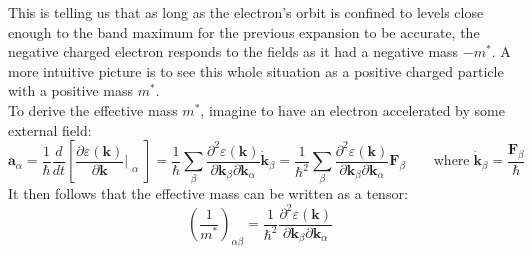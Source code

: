 \documentclass[10.75pt,a4paper,openright,bottom=2cm]{article}
\renewcommand{\Vec}[1]{\boldsymbol{#1}}
\begin{document}
This is telling us that as long as the electron's orbit is confined to levels close enough to the band maximum for the previous expansion to be accurate, the negative charged electron responds to the fields as it had a negative mass $-m^*$. A more intuitive picture is to see this whole situation as a positive charged particle with a positive mass $m^*$.\\
To derive the effective mass $m^*$, imagine to have an electron accelerated by some external field:
\[
\Vec{a}_\alpha=\frac{1}{\hbar}\frac{d}{dt}\left[\frac{\partial \varepsilon(\Vec{k})}{\partial\Vec{k}}\Bigr|_{\substack{\alpha}}\right]=\frac{1}{\hbar}\sum_\beta\frac{\partial^2\varepsilon(\Vec{k})}{\partial\Vec{k}_\beta\partial\Vec{k}_\alpha}\Dot{\Vec{k}}_\beta=\frac{1}{\hbar^2}\sum_\beta\frac{\partial^2\varepsilon(\Vec{k})}{\partial\Vec{k}_\beta\partial\Vec{k}_\alpha}\Vec{F}_\beta \qquad \text{where}\;\Dot{\Vec{k}}_\beta=\frac{\Vec{F}_\beta}{\hbar}
\]
It then follows that the effective mass can be written as a tensor:
\begin{equation}
\label{masstensor}
\left(\frac{1}{m^*}\right)_{\alpha\beta}=\frac{1}{\hbar^2}\frac{\partial^2\varepsilon(\Vec{k})}{\partial\Vec{k}_\beta\partial\Vec{k}_\alpha}
\end{equation}
\newpage
\end{document}
